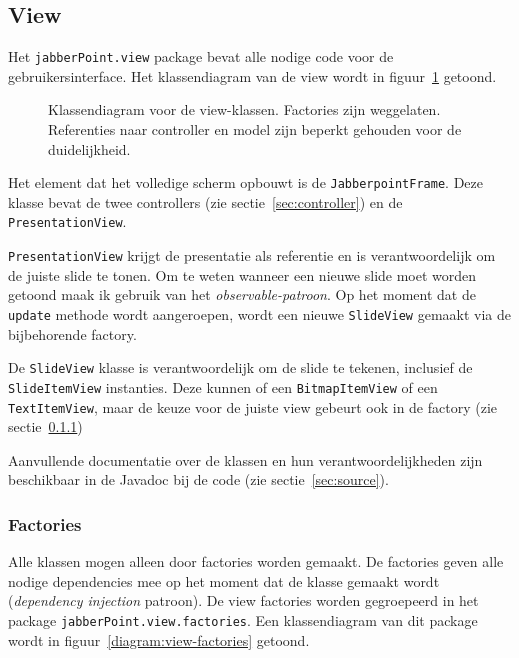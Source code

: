 \documentclass[a4paper]{article}
\newcommand{\code}[1]{\lstinline[columns=fixed]{#1}}
\newcommand{\diagram}[3][1.3]{
	\begin{figure}[!htb]
	 \caption{#3}
	 \label{diagram:#2}
	 \makebox[\textwidth][c]{\texttt{[image: Diagrams/\#2.pdf]}}%
	\end{figure}
}
\begin{document}
	\subsection{View}\label{sec:view}
		Het \code{jabberPoint.view} package bevat alle nodige code voor de gebruikersinterface.
		Het klassendiagram van de view wordt in figuur~\ref{diagram:view} getoond.

		\diagram[1]{view}{
			Klassendiagram voor de view-klassen.
			Factories zijn weggelaten.
			Referenties naar controller en model zijn beperkt gehouden voor de duidelijkheid.
		}

		Het element dat het volledige scherm opbouwt is de \code{JabberpointFrame}.
		Deze klasse bevat de twee controllers (zie sectie~\ref{sec:controller}) en de \code{PresentationView}.

		\code{PresentationView} krijgt de presentatie als referentie en is verantwoordelijk om de juiste slide te tonen.
		Om te weten wanneer een nieuwe slide moet worden getoond maak ik gebruik van het \textit{observable-patroon}.
		Op het moment dat de \code{update} methode wordt aangeroepen, wordt een nieuwe \code{SlideView} gemaakt via de bijbehorende factory.

		De \code{SlideView} klasse is verantwoordelijk om de slide te tekenen, inclusief de \code{SlideItemView} instanties.
		Deze kunnen of een \code{BitmapItemView} of een \code{TextItemView}, maar de keuze voor de juiste view gebeurt ook in de factory (zie sectie~\ref{sec:view-factories})

		Aanvullende documentatie over de klassen en hun verantwoordelijkheden zijn beschikbaar in de Javadoc bij de code (zie sectie~\ref{sec:source}).

		\subsubsection{Factories}\label{sec:view-factories}
			Alle klassen mogen alleen door factories worden gemaakt.
			De factories geven alle nodige dependencies mee op het moment dat de klasse gemaakt wordt (\textit{dependency injection} patroon).
			De view factories worden gegroepeerd in het package \code{jabberPoint.view.factories}.
			Een klassendiagram van dit package wordt in figuur~\ref{diagram:view-factories} getoond.
\end{document}

